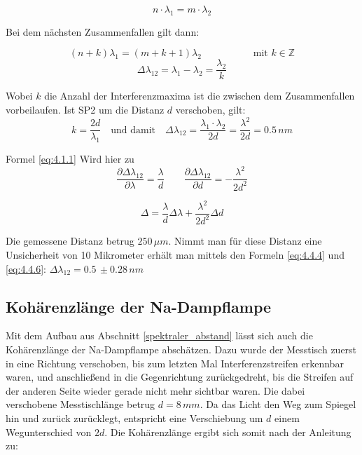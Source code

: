 \documentclass[
  headings=optiontotocandhead,
  twoside,
  openright,
  numbers=noenddot,
  toc=flat,
  11pt,
  parskip=full,
  listof=flat,
  bibliography=totoc,
  a4paper,
  DIV=14,
  BCOR=22mm,
  headheight=5mm,
  headinclude=true,
]{scrartcl}
\begin{document}
\begin{equation}
\label{eq:4.4.1}
n \cdot \lambda_{1} = m \cdot \lambda_{2}
\end{equation}

Bei dem nächsten Zusammenfallen gilt dann:

\begin{equation}
\label{eq:4.4.2}
\left( n + k \right) \lambda_{1} = \left( m+k+1 \right) \lambda_{2} \; \qquad \qquad \quad \text{mit } k \in \mathbb{Z}
\end{equation}
\begin{equation}
\label{eq:4.4.3}
\Delta \lambda_{12} = \lambda_{1}-\lambda_{2}=\frac{\lambda_{2}}{k}
\end{equation}

Wobei $k$ die Anzahl der Interferenzmaxima ist die zwischen dem Zusammenfallen vorbeilaufen. Ist SP2 um die Distanz $d$ verschoben, gilt:
\begin{equation}
\label{eq:4.4.4}
k=\frac{2d}{\lambda_1} \quad \text{und damit} \quad \Delta \lambda_{12}= \frac{\lambda_1 \cdot \lambda_2}{2d} = \frac{\lambda^{2}}{2d} = 0.5 \, nm
\end{equation}

Formel \ref{eq:4.1.1} Wird hier zu
\begin{equation}
\label{eq:4.4.5}
\frac{\partial \Delta \lambda_{12}}{\partial \lambda}=\frac{\lambda}{d} \qquad \frac{\partial
\Delta \lambda_{12}}{\partial d} = -\frac{\lambda^{2}}{2d^{2}}
\end{equation}

\begin{equation}
\Delta = \frac{\lambda}{d} \Delta \lambda +  \frac{\lambda^{2}}{2d^{2}} \Delta d
\label{eq:4.4.6}
\end{equation} 

Die gemessene Distanz betrug $250 \, \mu m$. Nimmt man für diese Distanz eine Unsicherheit von 10 Mikrometer erhält man mittels den Formeln \ref{eq:4.4.4} und \ref{eq:4.4.6}: $\Delta \lambda_{12}=0.5 \, \pm 0.28 \,nm$

\subsection{Kohärenzlänge der Na-Dampflampe} \label{kohaerenzlaenge_dampflampe}

Mit dem Aufbau aus Abschnitt \ref{spektraler_abstand} lässt sich auch die Kohärenzlänge der Na-Dampflampe abschätzen. Dazu wurde der Messtisch zuerst in eine Richtung verschoben, bis zum letzten Mal Interferenzstreifen erkennbar waren, und anschließend in die Gegenrichtung zurückgedreht, bis die Streifen auf der anderen Seite wieder gerade nicht mehr sichtbar waren. Die dabei verschobene Messtischlänge betrug $d = 8 \,mm$. Da das Licht den Weg zum Spiegel hin und zurück zurücklegt, entspricht eine Verschiebung um $d$ einem Wegunterschied von $2d$. Die Kohärenzlänge ergibt sich somit nach der Anleitung zu:
 
\end{document}
